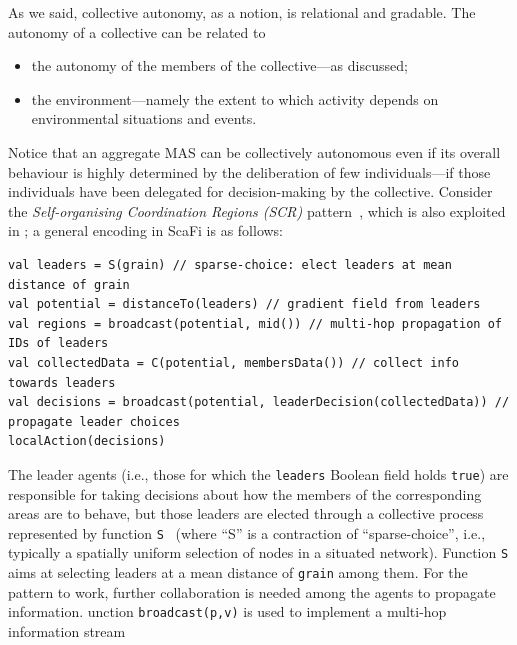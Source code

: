 As we said,
 collective autonomy, as a notion,
 is relational and gradable.
%
The autonomy of a collective can be related to
\begin{itemize}
\item the autonomy of the members of the collective---as discussed;
\item the environment---namely the extent to which activity depends on environmental situations and events.
\end{itemize}
%
Notice that an aggregate MAS can be collectively autonomous
 even if its overall behaviour
 is highly determined by the deliberation of few individuals---if those individuals have been delegated for decision-making by the collective.
%
Consider the \emph{Self-organising Coordination Regions (SCR)} pattern~\cite{casadei2019scr}, which is also exploited in ; a general encoding in ScaFi is as follows:
%
\begin{lstlisting}
val leaders = S(grain) // sparse-choice: elect leaders at mean distance of grain
val potential = distanceTo(leaders) // gradient field from leaders
val regions = broadcast(potential, mid()) // multi-hop propagation of IDs of leaders
val collectedData = C(potential, membersData()) // collect info towards leaders
val decisions = broadcast(potential, leaderDecision(collectedData)) // propagate leader choices
localAction(decisions)
\end{lstlisting}
%
The leader agents (i.e., those for which the \lstinline|leaders| Boolean field holds \lstinline|true|)
 are responsible for taking decisions
 about how the members of the corresponding areas
 are to behave,
 but those leaders are elected through a collective process
 represented by function \lstinline|S|~\cite{DBLP:conf/saso/MoBD18} (where ``S'' is a contraction of ``sparse-choice'', i.e., typically a spatially uniform selection of nodes in a situated network).
%
Function \lstinline|S| aims at selecting leaders at a mean distance of \lstinline|grain| among them.
%
For the pattern to work, further collaboration is needed among the agents to propagate information.
%
unction \lstinline|broadcast(p,v)| is used to implement a multi-hop information stream
